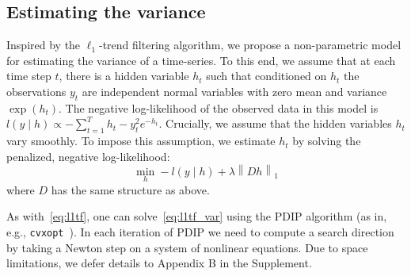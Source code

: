 \documentclass{article}
\newcommand{\given}{\;\vert\;}
\newcommand{\norm}[1]{\left\lVert #1 \right\rVert}
\begin{document}

\subsection{Estimating the variance}
\label{sec:l1tf_var}


Inspired by the $\ell_1$-trend filtering algorithm, we propose a
non-parametric model for estimating the variance of a time-series. To
this end, we assume that at each time step $t$, there is a hidden
variable $h_t$ such that conditioned on $h_t$ the observations $y_t$
are independent normal variables with zero mean and variance
$\exp(h_t)$. The negative log-likelihood of the observed data in this
model is $l(y\given h) \propto -\sum_{t=1}^T h_t - y_t^2e^{-h_t}$. Crucially,
we assume that the hidden variables $h_t$ vary smoothly. To impose
this assumption, we estimate $h_t$ by solving the penalized, negative
log-likelihood: 
\begin{equation}
\min_h -l(y\given h)+\lambda \norm{ Dh }_1
\label{eq:l1tf_var}
\end{equation}
 where $D$ has the same structure as above.

As with~\eqref{eq:l1tf}, one can solve~\eqref{eq:l1tf_var} using the
PDIP algorithm (as in, e.g.,
\texttt{cvxopt}~\citep{andersen_cvxopt:_2013}). In each iteration of
PDIP we need to compute a search direction by taking a Newton
step on a system of nonlinear equations. Due to space limitations, we
defer details to Appendix B in the Supplement.
\end{document}
